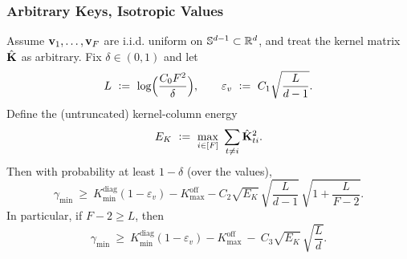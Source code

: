\subsubsection{Arbitrary Keys, Isotropic Values}
\label{app:combined-regime1}
\label{app:theory:margin_bounds:akrv}
\label{app:theory:proof:arbk-isov}

\begin{theorem}\label{thm:combined-akrv}
Assume \({\mathbf{v}}_{1},\dots,{\mathbf{v}}_{F}\) are i.i.d. uniform on \(\mathbb{S}^{d-1}\subset\mathbb{R}^d\), and treat the kernel matrix \(\hat{\mathbf{K}}\) as arbitrary.
Fix \(\delta\in(0,1)\) and let
\[
L\ \vcentcolon=\ \log\!\Big(\frac{C_{0} F^2}{\delta}\Big),
\qquad
\varepsilon_{v}\ \vcentcolon=\ C_{1}\sqrt{\frac{L}{d-1}}.
\]
Define the (untruncated) kernel-column energy
\[
E_{K}\ \defeq\ \max_{i\in[F]}\ \sum_{t\neq i}\hat{\matK}_{ti}^2.
\]
Then with probability at least \(1-\delta\) (over the values),
\begin{equation}
\gamma_{\min}\ \ge\ K_{\min}^{\mathrm{diag}}(1-\varepsilon_{v})-K_{\max}^{\mathrm{off}} - C_{2}\sqrt{E_K}\,\sqrt{\frac{L}{d-1}}\,\sqrt{1+\frac{L}{F-2}}.
\label{eq:app:akrv:thm-full}
\end{equation}
In particular, if \(F-2\ge L\), then
\begin{equation}
\gamma_{\min}
\ \ge\
K_{\min}^{\mathrm{diag}}(1-\varepsilon_{v})-K_{\max}^{\mathrm{off}}
\ -\ C_{3}\sqrt{E_K}\,\sqrt{\frac{L}{d}}.
\label{eq:app:akrv:thm}
\end{equation}
\end{theorem}

